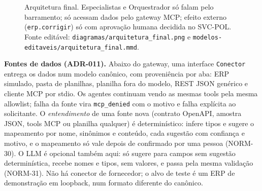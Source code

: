 \documentclass[10pt,a4paper]{article}
\newcommand{\code}[1]{\texttt{#1}}
\begin{document}
\begin{figure}[H]
\caption{Arquitetura final. Especialistas e Orquestrador só falam pelo barramento; só acessam dados pelo gateway MCP;
efeito externo (\code{erp.corrigir}) só com aprovação humana decidida no SVC-POL. Fonte editável:
\code{diagramas/arquitetura\_final.png} e \code{modelos-editaveis/arquitetura\_final.mmd}.}
\label{fig:arq}
\end{figure}
\textbf{Fontes de dados (ADR-011).} Abaixo do gateway, uma interface \code{Conector} entrega os dados num modelo
canônico, com proveniência por aba: ERP simulado, pasta de planilhas, planilha fora do modelo, REST JSON genérico e
cliente MCP por stdio. Os agentes continuam vendo as mesmas tools pela mesma allowlist; falha da fonte vira
\code{mcp\_denied} com o motivo e falha explícita ao solicitante. O \emph{entendimento} de uma fonte nova (contrato
OpenAPI, amostra JSON, tools MCP ou planilha qualquer) é determinístico: infere tipos e sugere o mapeamento por nome,
sinônimos e conteúdo, cada sugestão com confiança e motivo, e o mapeamento só vale depois de confirmado por uma pessoa
(NORM-30). O LLM é opcional também aqui: só sugere para campos sem sugestão determinística, recebe nomes e tipos, sem
valores, e passa pela mesma validação (NORM-31). Não há conector de fornecedor; o alvo de teste é um ERP de
demonstração em loopback, num formato diferente do canônico.
\end{document}
